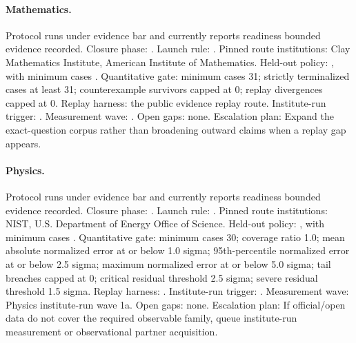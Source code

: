 \paragraph{Mathematics.}
Protocol  runs under evidence bar  and currently reports readiness bounded evidence recorded.
Closure phase: . Launch rule: .
Pinned route institutions: Clay Mathematics Institute, \allowbreak American Institute of Mathematics.
Held-out policy: , with minimum cases .
Quantitative gate: minimum cases 31; strictly terminalized cases at least 31; counterexample survivors capped at 0; replay divergences capped at 0.
Replay harness: the public evidence replay route.
Institute-run trigger: . Measurement wave: .
Open gaps: none.
Escalation plan: Expand the exact-question corpus rather than broadening outward claims when a replay gap appears.

\paragraph{Physics.}
Protocol  runs under evidence bar  and currently reports readiness bounded evidence recorded.
Closure phase: . Launch rule: .
Pinned route institutions: NIST, \allowbreak U.S. Department of Energy Office of Science.
Held-out policy: , with minimum cases .
Quantitative gate: minimum cases 30; coverage ratio 1.0; mean absolute normalized error at or below 1.0 sigma; 95th-percentile normalized error at or below 2.5 sigma; maximum normalized error at or below 5.0 sigma; tail breaches capped at 0; critical residual threshold 2.5 sigma; severe residual threshold 1.5 sigma.
Replay harness: .
Institute-run trigger: . Measurement wave: Physics institute-run wave 1a.
Open gaps: none.
Escalation plan: If official/open data do not cover the required observable family, queue institute-run measurement or observational partner acquisition.

